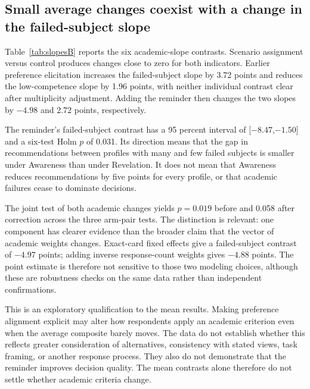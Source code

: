 \subsection{Small average changes coexist with a change in the failed-subject slope}
\begin{addition}
Table~\ref{tab:slopesB} reports the six academic-slope contrasts. Scenario assignment versus control produces changes close to zero for both indicators. Earlier preference elicitation increases the failed-subject slope by 3.72 points and reduces the low-competence slope by 1.96 points, with neither individual contrast clear after multiplicity adjustment. Adding the reminder then changes the two slopes by $-4.98$ and 2.72 points, respectively.
\end{addition}
\begin{addition}
The reminder's failed-subject contrast has a 95 percent interval of [$-8.47$,$-1.50$] and a six-test Holm $p$ of 0.031. Its direction means that the gap in recommendations between profiles with many and few failed subjects is smaller under Awareness than under Revelation. It does not mean that Awareness reduces recommendations by five points for every profile, or that academic failures cease to dominate decisions.

The joint test of both academic changes yields $p=0.019$ before and 0.058 after correction across the three arm-pair tests. The distinction is relevant: one component has clearer evidence than the broader claim that the vector of academic weights changes. Exact-card fixed effects give a failed-subject contrast of $-4.97$ points; adding inverse response-count weights gives $-4.88$ points. The point estimate is therefore not sensitive to those two modeling choices, although these are robustness checks on the same data rather than independent confirmations.

This is an exploratory qualification to the mean results. Making preference alignment explicit may alter how respondents apply an academic criterion even when the average composite barely moves. The data do not establish whether this reflects greater consideration of alternatives, consistency with stated views, task framing, or another response process. They also do not demonstrate that the reminder improves decision quality. The mean contrasts alone therefore do not settle whether academic criteria change.
\end{addition}

